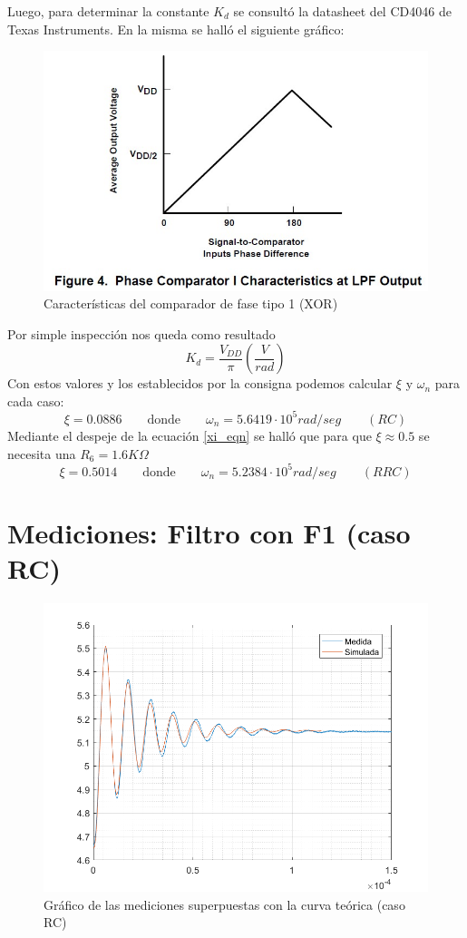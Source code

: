 \documentclass{article}
\begin{document}
Luego, para determinar la constante $K_d$ se consultó la datasheet del CD4046 de Texas Instruments. En la misma se halló el siguiente gráfico:
\begin{figure}[H]
\centering
\includegraphics[width=0.6\linewidth]{images/Kd.jpg}
\caption{Características del comparador de fase tipo 1 (XOR)}
\label{fig:comp1}
\end{figure}
Por simple inspección nos queda como resultado
\[ K_d= \frac{V_{DD}}{\pi} \left(\frac{V}{rad}\right) \]
Con estos valores y los establecidos por la consigna podemos calcular $\xi$ y $\omega_n$ para cada caso:
\[ \xi = 0.0886 \qquad \text{donde} \qquad \omega_n = 5.6419\cdot 10^{5} rad/seg \qquad (RC) \]
Mediante el despeje de la ecuación \ref{xi_eqn} se halló que para que $\xi \approx 0.5$ se necesita una $R_6 = 1.6K\Omega$
\[ \xi = 0.5014 \qquad \text{donde} \qquad \omega_n = 5.2384\cdot 10^{5} rad/seg \qquad (RRC) \]


\newpage
\section*{Mediciones: Filtro con F1 (caso RC)}


\begin{figure}[H]
\centering
\includegraphics[width=0.8\linewidth]{images/conF1_superpuestas.PNG}
\caption{Gráfico de las mediciones superpuestas con la curva teórica (caso RC)}
\label{fig:superpF1}
\end{figure}
\end{document}
